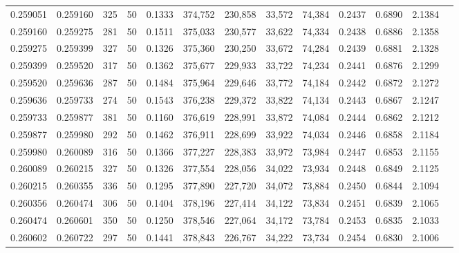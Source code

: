 \begin{tabular}{rrrrrrrrrrrrr}
0.259051 & 0.259160 &   325 &  50 &                                     0.1333 & 374,752 & 230,858 &  33,572 &  74,384 & 0.2437 & 0.6890 & 2.1384 \\
0.259160 & 0.259275 &   281 &  50 &                                     0.1511 & 375,033 & 230,577 &  33,622 &  74,334 & 0.2438 & 0.6886 & 2.1358 \\
0.259275 & 0.259399 &   327 &  50 &                                     0.1326 & 375,360 & 230,250 &  33,672 &  74,284 & 0.2439 & 0.6881 & 2.1328 \\
0.259399 & 0.259520 &   317 &  50 &                                     0.1362 & 375,677 & 229,933 &  33,722 &  74,234 & 0.2441 & 0.6876 & 2.1299 \\
0.259520 & 0.259636 &   287 &  50 &                                     0.1484 & 375,964 & 229,646 &  33,772 &  74,184 & 0.2442 & 0.6872 & 2.1272 \\
0.259636 & 0.259733 &   274 &  50 &                                     0.1543 & 376,238 & 229,372 &  33,822 &  74,134 & 0.2443 & 0.6867 & 2.1247 \\
0.259733 & 0.259877 &   381 &  50 &                                     0.1160 & 376,619 & 228,991 &  33,872 &  74,084 & 0.2444 & 0.6862 & 2.1212 \\
0.259877 & 0.259980 &   292 &  50 &                                     0.1462 & 376,911 & 228,699 &  33,922 &  74,034 & 0.2446 & 0.6858 & 2.1184 \\
0.259980 & 0.260089 &   316 &  50 &                                     0.1366 & 377,227 & 228,383 &  33,972 &  73,984 & 0.2447 & 0.6853 & 2.1155 \\
0.260089 & 0.260215 &   327 &  50 &                                     0.1326 & 377,554 & 228,056 &  34,022 &  73,934 & 0.2448 & 0.6849 & 2.1125 \\
0.260215 & 0.260355 &   336 &  50 &                                     0.1295 & 377,890 & 227,720 &  34,072 &  73,884 & 0.2450 & 0.6844 & 2.1094 \\
0.260356 & 0.260474 &   306 &  50 &                                     0.1404 & 378,196 & 227,414 &  34,122 &  73,834 & 0.2451 & 0.6839 & 2.1065 \\
0.260474 & 0.260601 &   350 &  50 &                                     0.1250 & 378,546 & 227,064 &  34,172 &  73,784 & 0.2453 & 0.6835 & 2.1033 \\
0.260602 & 0.260722 &   297 &  50 &                                     0.1441 & 378,843 & 226,767 &  34,222 &  73,734 & 0.2454 & 0.6830 & 2.1006 \\

\end{tabular}

